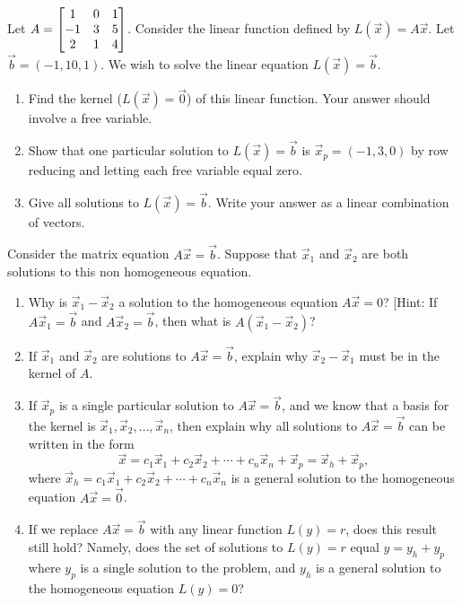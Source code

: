 \begin{problem}
Let 
$A=
\begin{bmatrix}
\begin{matrix} 1\\-1\\2 \end{matrix}&
\begin{matrix} 0\\3\\1 \end{matrix}&
\begin{matrix} 1\\5\\4 \end{matrix}
\end{bmatrix}$. Consider the linear function defined by  $L(\vec x)=A\vec x$. Let $\vec b=(-1,10,1)$.  We wish to solve the linear equation $L(\vec x)=\vec b$. 
\begin{enumerate}
 \item Find the kernel ($L(\vec x)=\vec 0$) of this linear function. Your answer should involve a free variable.
 \item Show that one particular solution to $L(\vec x) = \vec b$ is $\vec x_p = (-1,3,0)$ by row reducing and letting each free variable equal zero.  
 \item Give all solutions to $L(\vec x) = \vec b$.  Write your answer as a linear combination of vectors. 
\end{enumerate}
\end{problem}

\begin{problem}
 Consider the matrix equation $A\vec x = \vec b$.  Suppose that $\vec x_1$ and $\vec x_2$ are both solutions to this non homogeneous equation.
\begin{enumerate}
 \item Why is $\vec x_1-\vec x_2$ a solution to the homogeneous equation $A\vec x = 0$? [Hint: If $A\vec x_1=\vec b$ and $A\vec x_2=\vec b$, then what is $A(\vec x_1-\vec x_2)$?
 \item If $\vec x_1$ and $\vec x_2$ are solutions to $A\vec x=\vec b$, explain why $\vec x_2-\vec x_1$ must be in the kernel of $A$.
 \item If $\vec x_p$ is a single particular solution to $A\vec x=\vec b$, and we know that a basis for the kernel is $\vec x_1,\vec x_2,\ldots, \vec x_n$, then explain why all solutions to $A\vec x = \vec b$ can be written in the form 
$$\vec x=c_1\vec x_1+c_2\vec x_2+\cdots+ c_n\vec x_n +\vec x_p = \vec x_h+\vec x_p,$$ 
where $\vec x_h = c_1\vec x_1+c_2\vec x_2+\cdots+ c_n\vec x_n$ is a general solution to the homogeneous equation $A\vec x = \vec 0$.  
 \item If we replace $A\vec x=\vec b$ with any linear function $L(y)=r$, does this result still hold? Namely, does the set of solutions to $L(y)=r$ equal $y=y_h+y_p$ where $y_p$ is a single solution to the problem, and $y_h$ is a general solution to the homogeneous equation $L(y)=0$?
\end{enumerate}

\end{problem}

